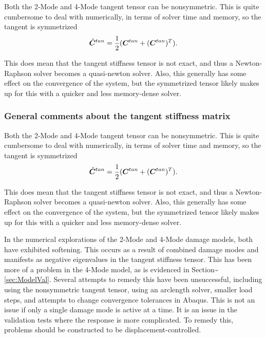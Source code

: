 \documentclass[11pt]{article}
\begin{document}
Both the 2-Mode and 4-Mode tangent tensor can be nonsymmetric. This is
quite cumbersome to deal with numerically, in terms of solver time and
memory, so the tangent is symmetrized
\begin{equation}
  \label{eq:OpenDM_SymTang}
  \hat{\bm{C}}^{tan} = \frac{1}{2} (\bm{C}^{tan} + (\bm{C}^{tan})^T).
\end{equation}

This does mean that the tangent stiffness tensor is not exact, and
thus a Newton-Raphson solver becomes a quasi-newton solver. Also, this
generally has some effect on the convergence of the system, but the
symmetrized tensor likely makes up for this with a quicker and less
memory-dense solver. 

\subsubsection{General comments about the tangent stiffness matrix}
\label{sec:org3f97406}
Both the 2-Mode and 4-Mode tangent tensor can be nonsymmetric. This is
quite cumbersome to deal with numerically, in terms of solver time and
memory, so the tangent is symmetrized
\begin{equation}
  \label{eq:OpenDM_SymTang}
  \hat{\bm{C}}^{tan} = \frac{1}{2} (\bm{C}^{tan} + (\bm{C}^{tan})^T).
\end{equation}

This does mean that the tangent stiffness tensor is not exact, and
thus a Newton-Raphson solver becomes a quasi-newton solver. Also, this
generally has some effect on the convergence of the system, but the
symmetrized tensor likely makes up for this with a quicker and less
memory-dense solver. 

In the numerical explorations of the 2-Mode and 4-Mode damage models,
both have exhibited softening. This occurs as a result of combined
damage modes and manifests as negative eigenvalues in the tangent
stiffness tensor. This has been more of a problem in the 4-Mode model,
as is evidenced in Section\textasciitilde{}\ref{sec:ModelVal}. Several attempts to
remedy this have been unsuccessful, including using the nonsymmetric
tangent tensor, using an arclength solver, smaller load steps, and
attempts to change convergence tolerances in Abaqus. This is not an
issue if only a single damage mode is active at a time. It is an issue
in the validation tests where the response is more complicated. To
remedy this, problems should be constructed to be
displacement-controlled.
\end{document}
